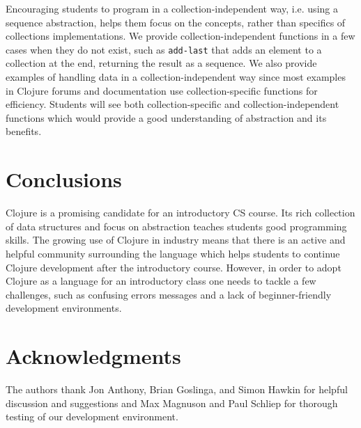 \documentclass[submission,copyright,creativecommons]{eptcs}
\newcommand{\allcomments}[1]{{#1}}
\newcommand{\joecomment}[1]{{\bf \color{JoesGold}{\allcomments{{#1}}}}}
\newcommand{\todo}[1]{{\bf \color{magenta}{\allcomments{ To-do: {#1}}}}}
\begin{document}
Encouraging students to program in a collection-independent way, i.e. using a sequence abstraction, helps them focus on the concepts, rather than specifics of collections implementations. We provide collection-independent functions in a few cases when they do not exist, such as {\tt add-last} that adds an element to a collection at the end, returning the result as a sequence. We also provide examples of handling data in a collection-independent way since most  examples in Clojure forums and documentation use collection-specific functions for efficiency. Students will see both collection-specific and collection-independent functions which would provide a good understanding of abstraction and its benefits. 



\section{Conclusions}
Clojure is a promising candidate for an introductory CS course. Its rich collection of data structures and focus on abstraction teaches students good programming skills. The growing use of Clojure in industry means that there is an active and helpful community surrounding the language which helps students to continue Clojure development after the introductory course. However, in order to adopt Clojure as a language for an introductory class one needs to tackle a few challenges, such as confusing errors messages and  a lack of beginner-friendly development environments.

\section{Acknowledgments}
The authors thank Jon Anthony, Brian Goslinga, and Simon Hawkin for helpful discussion and suggestions and %
Max Magnuson and Paul Schliep for thorough testing of our development environment. 




\end{document}
